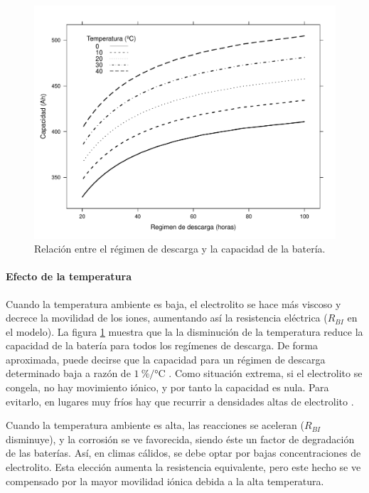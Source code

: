 %
\begin{figure}
\includegraphics[scale=0.75]{../figs/Bateria_Capacidad}

\caption{Relación entre el régimen de descarga y la capacidad de la batería.\label{fig:RegimenDescargaCapacidad}}



\end{figure}



\paragraph{Efecto de la temperatura}

Cuando la temperatura ambiente es baja, el electrolito se hace más
viscoso y decrece la movilidad de los iones, aumentando así la resistencia
eléctrica ($R_{BI}$ en el modelo). La figura \ref{fig:RegimenDescargaCapacidad}
muestra que la la disminución de la temperatura reduce la capacidad
de la batería para todos los regímenes de descarga. De forma aproximada,
puede decirse que la capacidad para un régimen de descarga determinado
baja a razón de $\SI{1}{\percent\per\celsius}$ \citep{Lorenzo1994}.
Como situación extrema, si el electrolito se congela, no hay movimiento
iónico, y por tanto la capacidad es nula. Para evitarlo, en lugares
muy fríos hay que recurrir a densidades altas de electrolito .

Cuando la temperatura ambiente es alta, las reacciones se aceleran
($R_{BI}$ disminuye), y la corrosión se ve favorecida, siendo éste
un factor de degradación de las baterías. Así, en climas cálidos,
se debe optar por bajas concentraciones de electrolito. Esta elección
aumenta la resistencia equivalente, pero este hecho se ve compensado
por la mayor movilidad iónica debida a la alta temperatura.

